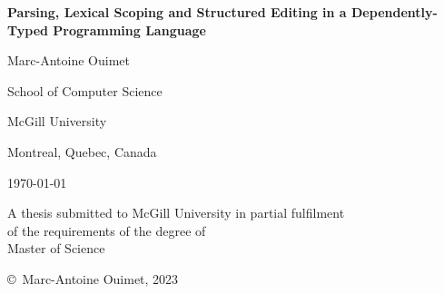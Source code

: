 \begin{titlepage}
\centering

\vspace*{0.5cm}

{\bfseries\LARGE Parsing, Lexical Scoping and Structured Editing in a Dependently-Typed Programming Language}

\vspace{1.8cm}

{\large Marc-Antoine Ouimet}

\vspace{2cm}

School of Computer Science

McGill University

Montreal, Quebec, Canada

\vspace{1.5cm}

\monthyeardate\today

\vspace{2cm}

A thesis submitted to McGill University in partial fulfilment\\
of the requirements of the degree of\\
Master of Science

\vfill

\copyright\ Marc-Antoine Ouimet, 2023
\end{titlepage}
